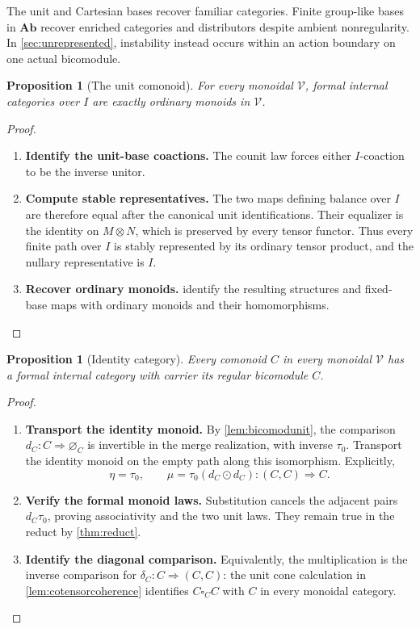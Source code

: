 \documentclass[11pt,reqno]{amsart}
\theoremstyle{plain}
\newtheorem{proposition}[theorem]{Proposition}
\theoremstyle{definition}
\theoremstyle{remark}
\numberwithin{equation}{section}
\newcommand{\V}{\mathcal V}
\newcommand{\cell}{\mathrel{\Longrightarrow}}
\newcommand{\emp}[1]{\varnothing_{#1}}
\newcommand{\Ab}{\mathbf{Ab}}
\newcommand{\wh}{\mathbin{\odot}}
\begin{document}
The unit and Cartesian bases recover familiar categories. Finite
group-like bases in $\Ab$ recover enriched categories and distributors
despite ambient nonregularity. In \cref{sec:unrepresented}, instability
instead occurs within an action boundary on one actual bicomodule.

\begin{proposition}[The unit comonoid]\label{prop:unitbase}
For every monoidal $\V$, formal internal categories over $I$ are
exactly ordinary monoids in $\V$.
\end{proposition}
\begin{proof}\leavevmode
\begin{enumerate}
\item \textbf{Identify the unit-base coactions.} The counit law forces either $I$-coaction to be the inverse unitor.

\item \textbf{Compute stable representatives.} The two maps defining balance over $I$ are therefore equal after
the canonical unit identifications. Their equalizer is the identity
on $M\otimes N$, which is preserved by every tensor functor.
Thus every finite path over $I$ is stably represented by its ordinary
tensor product, and the nullary representative is $I$.

\item \textbf{Recover ordinary monoids.}  identify the resulting structures
and fixed-base maps with ordinary monoids and their homomorphisms.\qedhere
\end{enumerate}
\end{proof}

\begin{proposition}[Identity category]\label{prop:identitycategory}
Every comonoid $C$ in every monoidal $\V$ has a formal internal
category with carrier its regular bicomodule $C$.
\end{proposition}
\begin{proof}\leavevmode
\begin{enumerate}
\item \textbf{Transport the identity monoid.} By \cref{lem:bicomodunit}, the comparison
$d_C:C\cell\emp C$ is invertible in the merge realization, with
inverse $\tau_0$. Transport the identity monoid on the empty path
along this isomorphism. Explicitly,
\[
 \eta=\tau_0,\qquad
 \mu=\tau_0(d_C\wh d_C):(C,C)\cell C.
\]

\item \textbf{Verify the formal monoid laws.} Substitution cancels the adjacent pairs $d_C\tau_0$, proving
associativity and the two unit laws. They remain true in the reduct
by \cref{thm:reduct}.

\item \textbf{Identify the diagonal comparison.} Equivalently, the multiplication is the
inverse comparison for $\delta_C:C\cell(C,C)$: the unit cone
calculation in \cref{lem:cotensorcoherence} identifies
$C\square_C C$ with $C$ in every monoidal category.\qedhere
\end{enumerate}
\end{proof}
\end{document}
